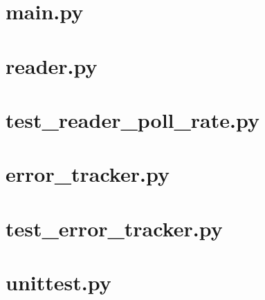\section{main.py}


\section{reader.py}


\section{test\_reader\_poll\_rate.py}


\section{error\_tracker.py}


\section{test\_error\_tracker.py}


\section{unittest.py}
